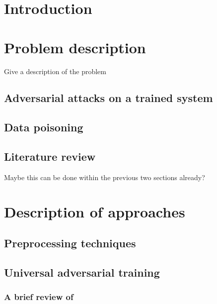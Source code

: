 \documentclass[12pt]{article}
\begin{document}
\section{Introduction}

\section{Problem description}
Give a description of the problem

\subsection{Adversarial attacks on a trained system}

\subsection{Data poisoning}

\subsection{Literature review}
Maybe this can be done within the previous two sections already?

\section{Description of approaches}

\subsection{Preprocessing techniques}

\subsection{Universal adversarial training}

\subsubsection{A brief review of \cite{shafahi_universal_2018}}
\end{document}
